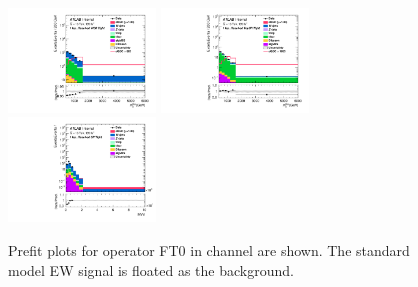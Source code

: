 \begin{figure}[ht]
    	\includegraphics[width=0.35\textwidth]{figures/aQGC/Region_disttagMjj_DCRVjetTight_BMin0_T0_Y6051_incTag1_J2_L1_incJet1_Prefitlog.pdf}
    	\includegraphics[width=0.35\textwidth]{figures/aQGC/Region_disttagMjj_DCRTopTight_BMin0_T0_Y6051_incTag1_J2_L1_incJet1_Prefitlog.pdf}
    	\includegraphics[width=0.35\textwidth]{figures/aQGC/Region_distMVV_DSRVBSTight_BMin0_T0_Y6051_incTag1_J2_L1_incJet1_Prefitlog.pdf}
        \caption{Prefit plots for operator FT0 in \olep channel are shown. The standard model EW signal is floated as the background.}
        \label{fig:1lepFT0}
\end{figure}

